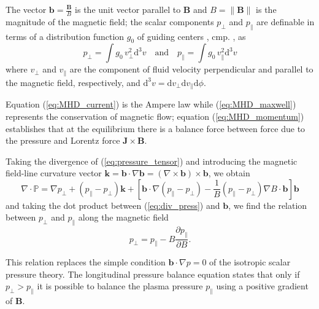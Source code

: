 The vector $\mathbf{b}=\frac{\mathbf{B}}{B}$ is the unit vector parallel to $\mathbf{B}$ and $B=\|\mathbf{B}\|$ is the magnitude of the magnetic field; the scalar components $p_\perp$ and $p_\parallel$ are definable in terms of a distribution function $g_0$ of guiding centers , cmp. \cite[p. 1614]{magnetic_mirror}, as
\begin{equation}\label{eq:pressure_components}
  p_\perp=\int g_0\,v^2_\perp \mathrm{d}^3 v \quad\mbox{and}\quad p_\parallel=\int g_0\,v^2_\parallel \mathrm{d}^3 v
\end{equation}
where $v_\perp$ and $v_\parallel$ are the component of fluid velocity perpendicular and parallel to the magnetic field, respectively, and
$\mathrm{d}^3 v=\mathrm{d}v_\perp\mathrm{d}v_\parallel\mathrm{d}\phi$.

Equation (\ref{eq:MHD_current}) is the Ampere law while (\ref{eq:MHD_maxwell}) represents the conservation of magnetic flow; equation (\ref{eq:MHD_momentum}) establishes that at the equilibrium there is a balance force between force due to the pressure and Lorentz force $\mathbf{J}\times\mathbf{B}$.
\medskip

Taking the divergence of (\ref{eq:pressure_tensor}) and introducing the magnetic field-line curvature vector $\mathbf{k}=\mathbf{b}\cdot\nabla\mathbf{b}=(\nabla\times\mathbf{b})\times\mathbf{b}$, we obtain
\begin{equation}\label{eq:div_press}
  \nabla\cdot\mathbb{P}=\nabla p_\perp+(p_\parallel - p_\perp)\mathbf{k}+\left[\mathbf{b}\cdot\nabla(p_\parallel - p_\perp)-
  \frac{1}{B}(p_\parallel - p_\perp)\nabla B\cdot\mathbf{b}\right]\mathbf{b}
\end{equation}
  and taking the dot product between (\ref{eq:div_press}) and $\mathbf{b}$, we find the relation between $p_\perp$ and $p_\parallel$ along the magnetic field
\begin{equation}\label{eq:pressure_balance}
  p_\perp=p_\parallel-B\frac{\partial p_\parallel}{\partial B}.
\end{equation}

This relation replaces the simple condition $\mathbf{b}\cdot\nabla p=0$ of the isotropic scalar pressure theory. The longitudinal pressure balance equation states that only if $p_\perp>p_\parallel$ it is possible to balance the plasma pressure $p_\parallel$ using a positive gradient of $\mathbf{B}$.


